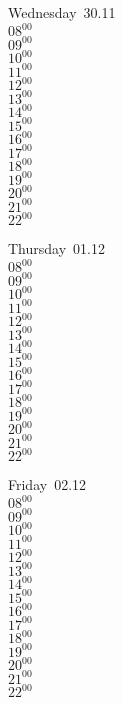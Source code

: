 \documentclass[11pt,a4paper]{book}\usepackage[]{graphicx}\usepackage[]{color}
\begin{document}
\begin{weekdaybox}
  Wednesday~30.11\\
  { 
  \vfill
  $08^{00}$\\
$09^{00}$\\
$10^{00}$\\
$11^{00}$\\
$12^{00}$\\
$13^{00}$\\
$14^{00}$\\
$15^{00}$\\
$16^{00}$\\
$17^{00}$\\
$18^{00}$\\
$19^{00}$\\
$20^{00}$\\
$21^{00}$\\
$22^{00}$\\
  }
\end{weekdaybox}
\clearpage
\begin{headerbox}
\end{headerbox}
\begin{weekdaybox}
  Thursday~01.12\\
  { 
  \vfill
  $08^{00}$\\
$09^{00}$\\
$10^{00}$\\
$11^{00}$\\
$12^{00}$\\
$13^{00}$\\
$14^{00}$\\
$15^{00}$\\
$16^{00}$\\
$17^{00}$\\
$18^{00}$\\
$19^{00}$\\
$20^{00}$\\
$21^{00}$\\
$22^{00}$\\
  }
\end{weekdaybox} 
\begin{weekdaybox}
  Friday~02.12\\
  { 
  \vfill
  $08^{00}$\\
$09^{00}$\\
$10^{00}$\\
$11^{00}$\\
$12^{00}$\\
$13^{00}$\\
$14^{00}$\\
$15^{00}$\\
$16^{00}$\\
$17^{00}$\\
$18^{00}$\\
$19^{00}$\\
$20^{00}$\\
$21^{00}$\\
$22^{00}$\\
  }
\end{weekdaybox}
\end{document}
